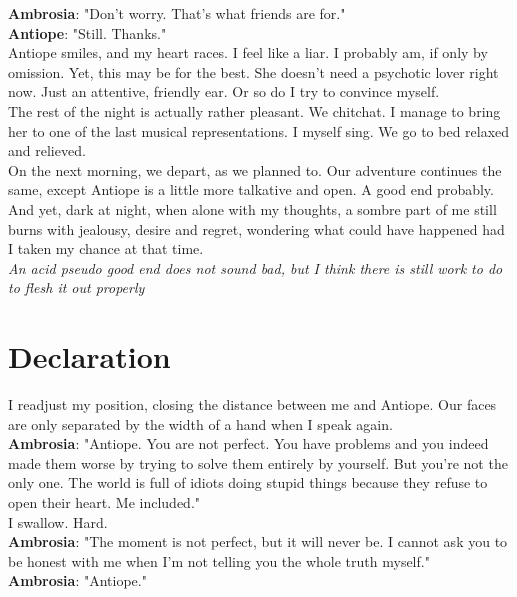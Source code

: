 \documentclass{report}
\newcommand{\dcomment}[1]{
	\emph{#1}
	\\
}
\newcommand{\speaker}[1]{
	\textbf{#1}: 
}
\newcommand{\gsection}[1]{
	\section*{#1}
	\label{#1}
}
\begin{document}
\speaker{Ambrosia} "Don't worry. That's what friends are for."\\

\speaker{Antiope} "Still. Thanks."\\

Antiope smiles, and my heart races. I feel like a liar. I probably am, if only by omission. Yet, this may be for the best. She doesn't need a psychotic lover right now. Just an attentive, friendly ear. Or so do I try to convince myself.\\

The rest of the night is actually rather pleasant. We chitchat. I manage to bring her to one of the last musical representations. I myself sing. We go to bed relaxed and relieved.\\

On the next morning, we depart, as we planned to. Our adventure continues the same, except Antiope is a little more talkative and open. A good end probably.\\

And yet, dark at night, when alone with my thoughts, a sombre part of me still burns with jealousy, desire and regret, wondering what could have happened had I taken my chance at that time.\\

\dcomment{
	An acid pseudo good end does not sound bad, but I think there is still work to do to flesh it out properly
}

\gsection{Declaration}

I readjust my position, closing the distance between me and Antiope. Our faces are only separated by the width of a hand when I speak again.\\

\speaker{Ambrosia} "Antiope. You are not perfect. You have problems and you indeed made them worse by trying to solve them entirely by yourself. But you're not the only one. The world is full of idiots doing stupid things because they refuse to open their heart. Me included."\\

I swallow. Hard.\\

\speaker{Ambrosia} "The moment is not perfect, but it will never be. I cannot ask you to be honest with me when I'm not telling you the whole truth myself."\\

\speaker{Ambrosia} "Antiope."\\
\end{document}
